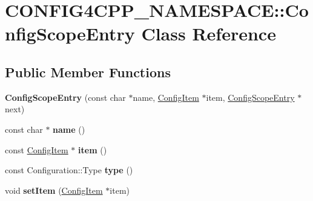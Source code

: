 \hypertarget{classCONFIG4CPP__NAMESPACE_1_1ConfigScopeEntry}{\section{C\-O\-N\-F\-I\-G4\-C\-P\-P\-\_\-\-N\-A\-M\-E\-S\-P\-A\-C\-E\-:\-:Config\-Scope\-Entry Class Reference}
\label{classCONFIG4CPP__NAMESPACE_1_1ConfigScopeEntry}
}
\subsection*{Public Member Functions}
\begin{DoxyCompactItemize}
\item 
\hypertarget{classCONFIG4CPP__NAMESPACE_1_1ConfigScopeEntry_af4b308ce4d76ac389805cafdd35c2479}{{\bfseries Config\-Scope\-Entry} (const char $\ast$name, \hyperlink{classCONFIG4CPP__NAMESPACE_1_1ConfigItem}{Config\-Item} $\ast$item, \hyperlink{classCONFIG4CPP__NAMESPACE_1_1ConfigScopeEntry}{Config\-Scope\-Entry} $\ast$next)}\label{classCONFIG4CPP__NAMESPACE_1_1ConfigScopeEntry_af4b308ce4d76ac389805cafdd35c2479}

\item 
\hypertarget{classCONFIG4CPP__NAMESPACE_1_1ConfigScopeEntry_ae896650e97eeb88a04370b969cb61406}{const char $\ast$ {\bfseries name} ()}\label{classCONFIG4CPP__NAMESPACE_1_1ConfigScopeEntry_ae896650e97eeb88a04370b969cb61406}

\item 
\hypertarget{classCONFIG4CPP__NAMESPACE_1_1ConfigScopeEntry_aea6bc1bbc29ddc45ee486e237f93a875}{const \hyperlink{classCONFIG4CPP__NAMESPACE_1_1ConfigItem}{Config\-Item} $\ast$ {\bfseries item} ()}\label{classCONFIG4CPP__NAMESPACE_1_1ConfigScopeEntry_aea6bc1bbc29ddc45ee486e237f93a875}

\item 
\hypertarget{classCONFIG4CPP__NAMESPACE_1_1ConfigScopeEntry_a02a2419b4ec72713354054f823561f37}{const Configuration\-::\-Type {\bfseries type} ()}\label{classCONFIG4CPP__NAMESPACE_1_1ConfigScopeEntry_a02a2419b4ec72713354054f823561f37}

\item 
\hypertarget{classCONFIG4CPP__NAMESPACE_1_1ConfigScopeEntry_ab7f8dc64a4bc470a26f5cb44efded015}{void {\bfseries set\-Item} (\hyperlink{classCONFIG4CPP__NAMESPACE_1_1ConfigItem}{Config\-Item} $\ast$item)}\label{classCONFIG4CPP__NAMESPACE_1_1ConfigScopeEntry_ab7f8dc64a4bc470a26f5cb44efded015}

\end{DoxyCompactItemize}
